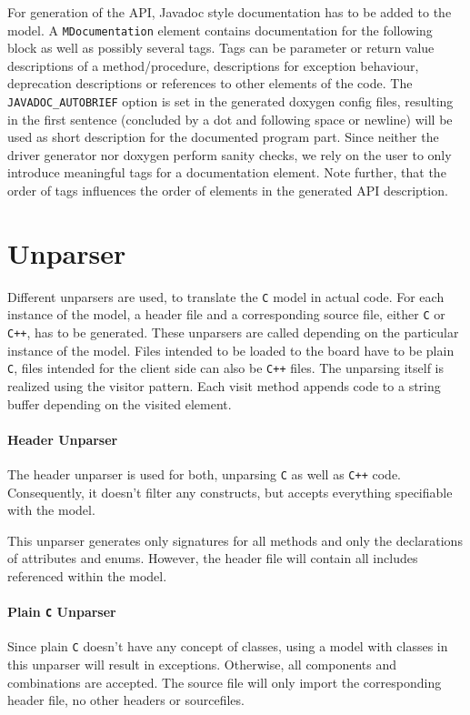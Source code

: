 \documentclass{report}
\begin{document}
For generation of the API, Javadoc style documentation has to be added to the model. A \texttt{MDocumentation} element contains documentation for the following block as well as possibly several tags. Tags can be parameter or return value descriptions of a method/procedure, descriptions for exception behaviour, deprecation descriptions or references to other elements of the code. The \texttt{JAVADOC\_AUTOBRIEF} option is set in the generated doxygen config files, resulting in the first sentence (concluded by a dot and following space or newline) will be used as short description for the documented program part. Since neither the driver generator nor doxygen perform sanity checks, we rely on the user to only introduce meaningful tags for a documentation element. Note further, that the order of tags influences the order of elements in the generated API description.

\section{Unparser}
Different unparsers are used, to translate the \texttt{C} model in actual code. For each instance of the model, a header file and a corresponding source file, either \texttt{C} or \texttt{C++}, has to be generated. These unparsers are called depending on the particular instance of the model. Files intended to be loaded to the board have to be plain \texttt{C}, files intended for the client side can also be \texttt{C++} files. The unparsing itself is realized using the visitor pattern. Each visit method appends code to a string buffer depending on the visited element.

\paragraph{Header Unparser}
The header unparser is used for both, unparsing \texttt{C} as well as \texttt{C++} code. Consequently, it doesn't filter any constructs, but accepts everything specifiable with the model.

This unparser generates only signatures for all methods and only the declarations of attributes and enums. However, the header file will contain all includes referenced within the model.

\paragraph{Plain \texttt{C} Unparser}
Since plain \texttt{C} doesn't have any concept of classes, using a model with classes in this unparser will result in exceptions. Otherwise, all components and combinations are accepted. The source file will only import the corresponding header file, no other headers or sourcefiles.
\end{document}
